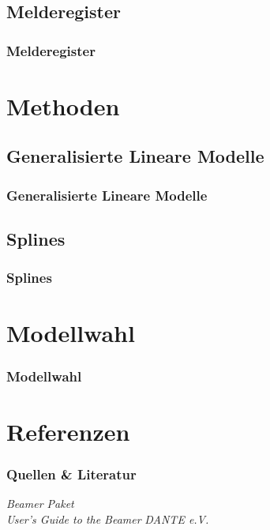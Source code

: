 \documentclass{beamer}\usepackage[]{graphicx}\usepackage[]{color}
\begin{document}
\subsection{Melderegister}
\begin{frame}\frametitle{Melderegister}

\end{frame}

\section{Methoden} 
\subsection{Generalisierte Lineare Modelle}
\begin{frame}
\frametitle{Generalisierte Lineare Modelle}

\end{frame}

\subsection{Splines}
\begin{frame}
\frametitle{Splines}

\end{frame}


\section{Modellwahl}
\begin{frame}\frametitle{Modellwahl}

\end{frame}

\section[Quellen]{Referenzen}
\begin{frame}\frametitle{Quellen \& Literatur}

\begin{thebibliography}{9}
 \emph{Beamer Paket} \\ 
 \emph{User's Guide to the Beamer} 
 \emph{DANTE e.V.}    
\end{thebibliography}


\end{frame}
\end{document}
